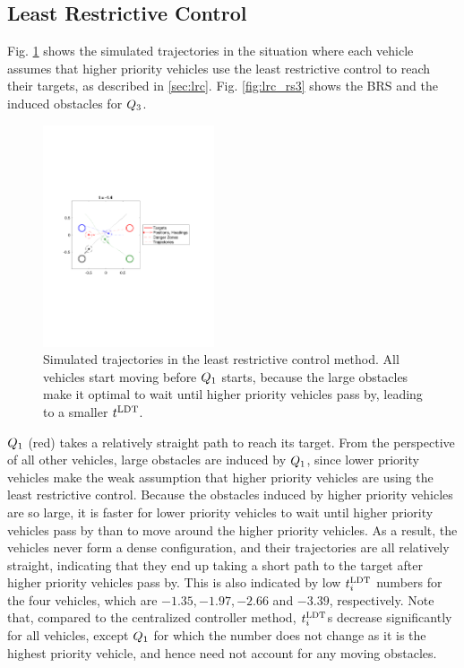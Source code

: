 \subsection{Least Restrictive Control}
Fig. \ref{fig:lrc_traj} shows the simulated trajectories in the situation where each vehicle assumes that higher priority vehicles use the least restrictive control to reach their targets, as described in \ref{sec:lrc}. Fig. \ref{fig:lrc_rs3} shows the BRS and the induced obstacles for $Q_3$.

\begin{figure}
  \centering
  \includegraphics[width=0.45\textwidth]{"fig/lrc_traj"}
  \caption{Simulated trajectories in the least restrictive control method. All vehicles start moving before $Q_1$ starts, because the large obstacles make it optimal to wait until higher priority vehicles pass by, leading to a smaller $t^\text{LDT}$. }
  \label{fig:lrc_traj}
\end{figure}

$Q_1$ (red) takes a relatively straight path to reach its target. From the perspective of all other vehicles, large obstacles are induced by $Q_1$, since lower priority vehicles make the weak assumption that higher priority vehicles are using the least restrictive control. Because the obstacles induced by higher priority vehicles are so large, it is faster for lower priority vehicles to wait until higher priority vehicles pass by than to move around the higher priority vehicles. As a result, the vehicles never form a dense configuration, and their trajectories are all relatively straight, indicating that they end up taking a short path to the target after higher priority vehicles pass by. This is also indicated by low $t^\text{LDT}_i$ numbers for the four vehicles, which are $-1.35, -1.97, -2.66$ and $-3.39$, respectively. Note that, compared to the centralized controller method, $t^\text{LDT}_i$s decrease significantly for all vehicles, except $Q_1$ for which the number does not change as it is the highest priority vehicle, and hence need not account for any moving obstacles. 

